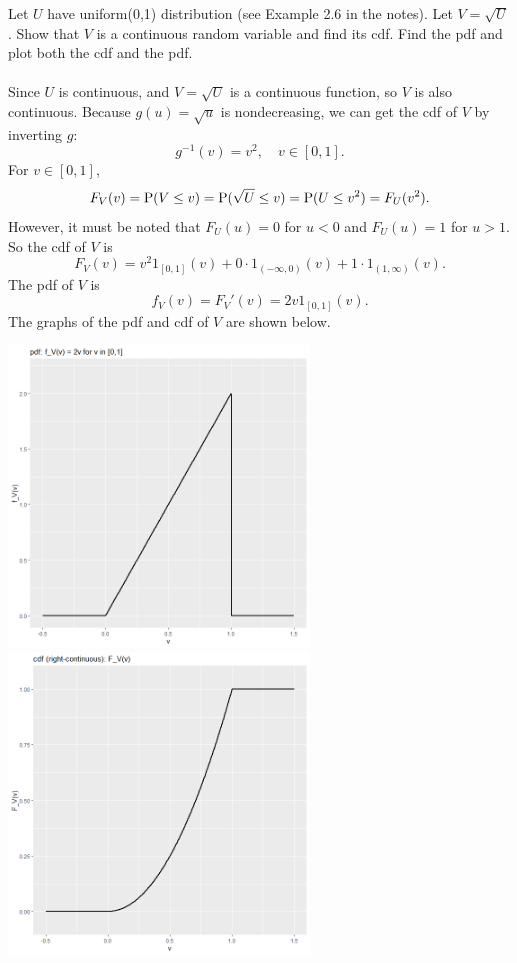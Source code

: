 \documentclass[12pt]{article}
\newcommand{\Prob}{{\rm P}}
\newenvironment{problem}[2][Problem]{\begin{trivlist}
\item[\hskip \labelsep {\bfseries #1}\hskip \labelsep {\bfseries #2.}]}
{\end{trivlist}}
\begin{document}
\begin{problem}{4}
  Let $U$ have uniform(0,1) distribution (see Example 2.6 in the notes). 
  Let $V = \sqrt{U}$. Show that $V$ is a continuous random variable 
  and find its cdf. Find the pdf and plot both the cdf and the pdf.
  \\\\
  Since $U$ is continuous, and $V = \sqrt{U}$ is a continuous function,
  so $V$ is also continuous. Because $g(u) = \sqrt{u}$ is nondecreasing,
  we can get the cdf of $V$ by inverting $g$:
  \[
    g^{-1}(v) = v^2, \quad v \in [0,1].
  \]
  For $v \in [0,1]$,
  \[
    F_V(v) = \Prob(V \le v) = \Prob(\sqrt{U} \le v) = \Prob(U \le v^2) = F_U(v^2).
  \]
  However, it must be noted that $F_U(u) = 0$ for $u < 0$ and
  $F_U(u) = 1$ for $u > 1$. So the cdf of $V$ is
  \[
    F_V(v) = v^2 1_{[0,1]}(v) + 0 \cdot 1_{(-\infty,0)}(v) 
    + 1 \cdot 1_{(1,\infty)}(v).
  \]
  The pdf of $V$ is
  \[
    f_V(v) = F_V'(v) = 2v 1_{[0,1]}(v).
  \]
  The graphs of the pdf and cdf of $V$ are shown below.
  \begin{center}
    \includegraphics[width=0.6\textwidth]{4pdf.png}
    \includegraphics[width=0.6\textwidth]{4cdf.png}
  \end{center}
\end{problem}
\end{document}
